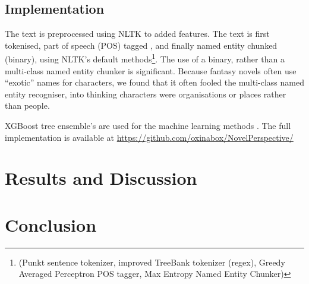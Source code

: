 \documentclass[11pt,a4paper]{article}
\newcommand{\parencite}{\citep}
\begin{document}
\subsection{Implementation}
The text is preprocessed using NLTK \parencite{bird2009natural} to added features.
The text is first tokenised, part of speech (POS) tagged , and finally named entity chunked (binary), using NLTK's default methods\footnote{(Punkt sentence tokenizer, improved TreeBank tokenizer (regex), Greedy Averaged Perceptron POS tagger, Max Entropy Named Entity Chunker)}.
The use of a binary, rather than a multi-class named entity chunker is significant.
Because fantasy novels often use ``exotic'' names for characters, we found that it often  fooled the multi-class named entity recogniser, into thinking characters were organisations or places rather than people.

XGBoost tree ensemble's are used for the machine learning methods \parencite{chen2016xgboost}.
The full implementation is available at \url{https://github.com/oxinabox/NovelPerspective/}


\section{Results and Discussion}\label{sec:results-and-discussion}


\section{Conclusion}\label{sec:conclusion}

\clearpage

\end{document}
